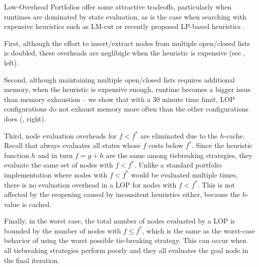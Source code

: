 Low-Overhead Portfolios offer some attractive tradeoffs,
particularly when runtimes are dominated by state evaluation, as is the case when searching with 
expensive heuristics such as LM-cut or recently proposed LP-based heuristics \cite{PommereningRHB14,ImaiF14}.

First, although the effort to insert/extract nodes from multiple
open/closed lists is doubled, these overheads are neglibigle when the
heuristic is expensive (see , left).

Second, although maintaining multiple open/closed lists requires additional memory,
when the heuristic is expensive enough, runtime becomes a bigger issue
than memory exhaustion  -- we show that with a 30 minute time limit, LOP
configurations do not exhaust memory more often than the other
configurations does (, right).

Third, node evaluation overheads for $f < f^*$ are eliminated due to the $h$-cache.
Recall that \astar always evaluates all states whose $f$ costs 
below $f^*$. Since the heuristic function $h$ and in turn $f=g+h$ are
the same among tiebreaking strategies, they evaluate the same set of
nodes with $f<f^*$. Unlike a standard portfolio implementation where 
nodes with $f<f^*$ would be evaluated multiple times, there is no evaluation overhead in a LOP
for nodes with $f<f^*$.
This is not
affected by the reopening caused by inconsitent heuristics either,
because the $h$-value is cached.


Finally, in the worst case, the total number of nodes evaluated by a LOP is bounded by the number of nodes with $f \leq f^*$, which is the same as the worst-case behavior of \astar using the worst possible tie-breaking strategy.
This can occur  when all tiebreaking
strategies perform poorly  and they all evaluates the goal node in the
final iteration.

